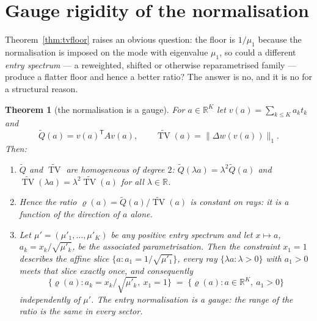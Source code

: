 \documentclass[11pt,a4paper]{article}
\theoremstyle{plain}
\newtheorem{theorem}{Theorem}[section]
\theoremstyle{definition}
\newcommand{\R}{\mathbb{R}}
\newcommand{\T}{\mathsf{T}}
\newcommand{\TV}{\operatorname{TV}}
\begin{document}
\section{Gauge rigidity of the normalisation}
\label{sec:gauge}

Theorem~\ref{thm:tvfloor} raises an obvious question: the floor is $1/\mu_1$
because the normalisation is imposed on the mode with eigenvalue $\mu_1$, so
could a different \emph{entry spectrum} --- a reweighted, shifted or otherwise
reparametrised family --- produce a flatter floor and hence a better ratio? The
answer is no, and it is no for a structural reason.

\begin{theorem}[the normalisation is a gauge]
\label{thm:gauge}
For $a\in\R^{K}$ let $v(a)=\sum_{k\le K}a_kt_k$ and
\begin{equation}
\label{eq:functionals}
  \widetilde Q(a)=v(a)^{\T}Av(a),
  \qquad
  \widetilde{\TV}(a)=\lVert\Delta w(v(a))\rVert_1 .
\end{equation}
Then:
\begin{enumerate}[label=\textup{(\roman*)},leftmargin=2.6em]
\item\label{G:hom} $\widetilde Q$ and $\widetilde{\TV}$ are homogeneous of
  degree $2$: $\widetilde Q(\lambda a)=\lambda^{2}\widetilde Q(a)$ and
  $\widetilde{\TV}(\lambda a)=\lambda^{2}\widetilde{\TV}(a)$ for all
  $\lambda\in\R$.
\item\label{G:ray} Hence the ratio
  $\varrho(a)=\widetilde Q(a)/\widetilde{\TV}(a)$ is constant on rays: it is a
  function of the direction of $a$ alone.
\item\label{G:gauge} Let $\mu'=(\mu'_1,\dots,\mu'_K)$ be \emph{any} positive
  entry spectrum and let $x\mapsto a$, $a_k=x_k/\sqrt{\mu'_k}$, be the
  associated parametrisation. Then the constraint $x_1=1$ describes the affine
  slice $\{a:a_1=1/\sqrt{\mu'_1}\}$, every ray $\{\lambda a:\lambda>0\}$ with
  $a_1>0$ meets that slice exactly once, and consequently
  \begin{equation}
  \label{eq:gaugeequal}
    \bigl\{\varrho(a):a_k=x_k/\sqrt{\mu'_k},\ x_1=1\bigr\}
    \;=\;\bigl\{\varrho(a):a\in\R^{K},\ a_1>0\bigr\}
  \end{equation}
  \emph{independently of $\mu'$}. The entry normalisation is a gauge: the range
  of the ratio is the same in every sector.
\end{enumerate}
\end{theorem}
\end{document}
